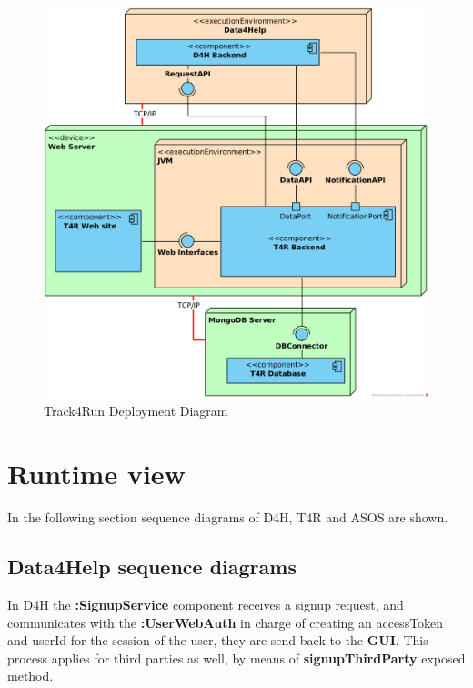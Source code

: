 \documentclass[a4paper, hidelinks, 12pt]{report}
\begin{document}
		\begin{figure}[H]
			\centering
			\includegraphics[width=1\textwidth]{diagrams/t4r_deployment_diagram.png}
			\caption[Track4Run Deployment Diagram]{Track4Run Deployment Diagram}
			\label{fig:t4r_deployment_diagram}
		\end{figure}
		
	\section{Runtime view}
	In the following section sequence diagrams of D4H, T4R and ASOS are shown. 
	
	\subsection{Data4Help sequence diagrams}
	In D4H the \textbf{:SignupService} component receives a signup request, and 
	communicates with the \textbf{:UserWebAuth} in charge of creating an accessToken and userId for the session of the user, they are send back to the \textbf{GUI}. This process applies for third parties as well, by means of \textbf{signupThirdParty} exposed method. 
	
\end{document}
